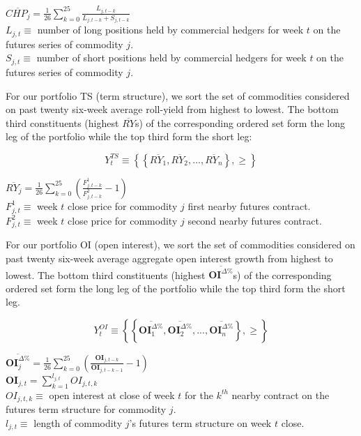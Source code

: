 \documentclass[]{elsarticle} %
\begin{document}
\(\overline{CHP_{j}}=\frac{1}{26}\sum_{k=0}^{25}\frac{L_{j,t-k}}{L_{j,t-k}+S_{j,t-k}}\)\\
\(L_{j,t}\equiv\) number of long positions held by commercial hedgers
for week \(t\) on the futures series of commodity \(j\).\\
\(S_{j,t}\equiv\) number of short positions held by commercial hedgers
for week \(t\) on the futures series of commodity \(j\).

For our portfolio TS (term structure), we sort the set of commodities
considered on past twenty six-week average roll-yield from highest to
lowest. The bottom third constituents (highest \(\overline{RY}\)s) of
the corresponding ordered set form the long leg of the portfolio while
the top third form the short leg:

\[Y_{t}^{TS}\equiv\left \{ \left \{ \overline{RY_{1}}, \overline{RY_{2}}, ..., \overline{RY_{n}} \right \}, \geq \right \}\]

\(\overline{RY_{j}}=\frac{1}{26}\sum_{k=0}^{25}(\frac{F_{j,t-k}^{1}}{F_{j,t-k}^{2}} - 1)\)\\
\(F_{j,t}^{1}\equiv\) week \(t\) close price for commodity \(j\) first
nearby futures contract.\\
\(F_{j,t}^{2}\equiv\) week \(t\) close price for commodity \(j\) second
nearby futures contract.

For our portfolio OI (open interest), we sort the set of commodities
considered on past twenty six-week average aggregate open interest
growth from highest to lowest. The bottom third constituents (highest
\(\overline{\mathbf{OI}^{\Delta \%}}\)s) of the corresponding ordered
set form the long leg of the portfolio while the top third form the
short leg.

\[Y_{t}^{OI}\equiv\left \{ \left \{ \overline{\mathbf{OI}_{1}^{\Delta \%}}, \overline{\mathbf{OI}_{2}^{\Delta \%}}, ..., \overline{\mathbf{OI}_{n}^{\Delta \%}} \right \}, \geq \right \}\]

\(\overline{\mathbf{OI}_{j}^{\Delta \%}}=\frac{1}{26}\sum_{k=0}^{25}(\frac{\mathbf{OI}_{j,t-k}}{\mathbf{OI}_{j,t-k-1}} - 1)\)\\
\(\mathbf{OI}_{j,t}=\sum_{k=1}^{l_{j,t}}OI_{j,t,k}\)\\
\(OI_{j,t,k}\equiv\) open interest at close of week \(t\) for the
\(k^{th}\) nearby contract on the futures term structure for commodity
\(j\).\\
\(l_{j,t}\equiv\) length of commodity \(j\)'s futures term structure on
week \(t\) close.
\end{document}

